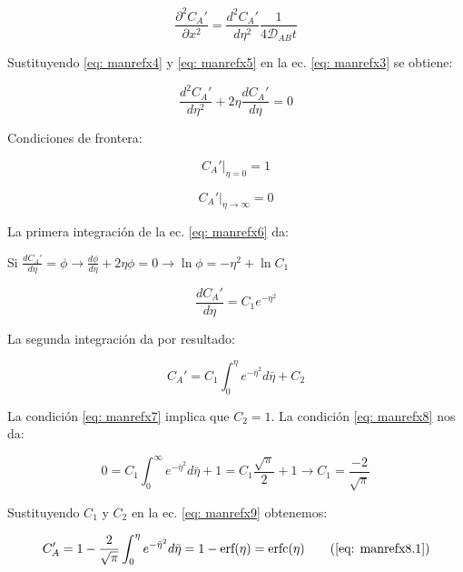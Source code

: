 \begin{equation} \label{eq: manrefx5}
	\frac{\partial^2 C_A'}{\partial x^2} =  \frac{d^2 C_A'}{d \eta^2} \frac{1}{4 \mathscr{D}_{AB}t}
\end{equation}

Sustituyendo \eqref{eq: manrefx4} y \eqref{eq: manrefx5} en la ec. \eqref{eq: manrefx3} se obtiene: 

\begin{equation} \label{eq: manrefx6}
	\frac{d^2 C_A'}{d \eta^2} + 2\eta \frac{d C_A'}{d \eta} = 0
\end{equation}

Condiciones de frontera:

\begin{equation} \label{eq: manrefx7}
	C_A'|_{\eta = 0} = 1
\end{equation}

\begin{equation} \label{eq: manrefx8}
	C_A'|_{\eta \to \infty} = 0
\end{equation}

La primera integración de la ec. \eqref{eq: manrefx6} da:

Si $\frac{d C_A'}{d \eta} = \phi \to \frac{d\phi}{d \eta} + 2 \eta \phi = 0 \to \ln{\phi} = -\eta^2 + \ln{C_1}$

\begin{equation} \label{eq: manrefx8.1}
	\frac{dC_A'}{d \eta} = C_1 e^{-\eta^2}
\end{equation}

La segunda integración da por resultado:

\begin{equation} \label{eq: manrefx9}
	C_A' = C_1 \int_0^\eta e^{-\bar{\eta}^2} d\bar{\eta} + C_2
\end{equation}

La condición \eqref{eq: manrefx7} implica que $C_2 = 1$. La condición \eqref{eq: manrefx8} nos da:

$$0 = C_1 \int_0^\infty e^{-\bar{\eta}^2} d\bar{\eta} +1 = C_1 \frac{\sqrt{\pi}}{2} + 1 \to C_1 = \frac{-2}{\sqrt{\pi}}$$

Sustituyendo $C_1$ y $C_2$ en la ec. \eqref{eq: manrefx9} obtenemos: 

\begin{equation}
C_A' = 1 - \frac{2}{\sqrt{\pi}} \int_0^\eta e^{-\bar{\eta}^2} d\bar{\eta} = 1 - \text{erf} (\eta) = \text{erfc}(\eta) 
\tag{\ref{eq: manrefx8.1}}
\end{equation}

